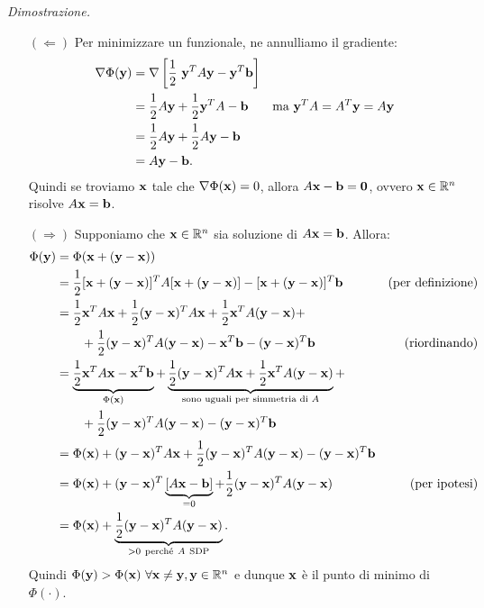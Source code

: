 \textit{Dimostrazione.}
\begin{itemize}
  \item [$(\Leftarrow)$] Per minimizzare un funzionale, ne annulliamo il gradiente:
  \begin{align*}
    \nabla \Phi (\mathbf{y}) & =\nabla \left[\frac{1}{2} \ \mathbf{y}^{T} A\mathbf{y} -\mathbf{y}^{T}\mathbf{b}\right] & \\
    & =\frac{1}{2} A\mathbf{y} +\frac{1}{2}\mathbf{y}^{T} A-\mathbf{b} & \text{ma $\mathbf{y}^{T} A=A^{T}\mathbf{y} =A\mathbf{y}$} \\
    & =\frac{1}{2} A\mathbf{y} +\frac{1}{2} A\mathbf{y} -\mathbf{b} & \\
    & =A\mathbf{y} -\mathbf{b}. &
  \end{align*}
  Quindi se troviamo $\mathbf{x}$ tale che $\nabla \Phi (\mathbf{x}) =0$, allora $A\mathbf{x} -\mathbf{b} =\mathbf{0}$, ovvero $\mathbf{x} \in \mathbb{R}^{n}$ risolve $A\mathbf{x} =\mathbf{b}$.

  \item[$(\Rightarrow)$] Supponiamo che $\mathbf{x} \in \mathbb{R}^{n}$ sia soluzione di $A\mathbf{x} =\mathbf{b}$. Allora:
  \begin{align*}
    \Phi (\mathbf{y}) & =\Phi (\mathbf{x} +(\mathbf{y} -\mathbf{x})) & \\
    & =\frac{1}{2}[\mathbf{x} +(\mathbf{y} -\mathbf{x})]^{T} A[\mathbf{x} +(\mathbf{y} -\mathbf{x})] -[\mathbf{x} +(\mathbf{y} -\mathbf{x})]^{T}\mathbf{b} & \text{(per definizione)} \\
    & =\frac{1}{2}\mathbf{x}^{T} A\mathbf{x} +\frac{1}{2}(\mathbf{y} -\mathbf{x})^{T} A\mathbf{x} +\frac{1}{2}\mathbf{x}^{T} A(\mathbf{y} -\mathbf{x}) + & \\
    & \qquad +\frac{1}{2}(\mathbf{y} -\mathbf{x})^{T} A(\mathbf{y} -\mathbf{x}) -\mathbf{x}^{T}\mathbf{b} -(\mathbf{y} -\mathbf{x})^{T}\mathbf{b} & \text{(riordinando)} \\
    & =\underbrace{\frac{1}{2}\mathbf{x}^{T} A\mathbf{x} -\mathbf{x}^{T}\mathbf{b}}_{\Phi (\mathbf{x})} +\underbrace{\frac{1}{2}(\mathbf{y} -\mathbf{x})^{T} A\mathbf{x} +\frac{1}{2}\mathbf{x}^{T} A(\mathbf{y} -\mathbf{x})}_{\text{sono uguali per simmetria di } A} + & \\
    & \qquad +\frac{1}{2}(\mathbf{y} -\mathbf{x})^{T} A(\mathbf{y} -\mathbf{x}) -(\mathbf{y} -\mathbf{x})^{T}\mathbf{b} & \\
    & =\Phi (\mathbf{x}) +(\mathbf{y} -\mathbf{x})^{T} A\mathbf{x} +\frac{1}{2}(\mathbf{y} -\mathbf{x})^{T} A(\mathbf{y} -\mathbf{x}) -(\mathbf{y} -\mathbf{x})^{T}\mathbf{b} & \\
    & =\Phi (\mathbf{x}) +(\mathbf{y} -\mathbf{x})^{T}\underbrace{[ A\mathbf{x} -\mathbf{b}]}_{=0} +\frac{1}{2}(\mathbf{y} -\mathbf{x})^{T} A(\mathbf{y} -\mathbf{x}) & \text{(per ipotesi)} \\
    & =\Phi (\mathbf{x}) +\underbrace{\frac{1}{2}(\mathbf{y} -\mathbf{x})^{T} A(\mathbf{y} -\mathbf{x})}_{ >0\ \text{perché} \ A\ \text{SDP}}. &
  \end{align*}
  Quindi $\Phi (\mathbf{y})  >\Phi (\mathbf{x}) \ \forall \mathbf{x} \neq \mathbf{y} ,\mathbf{y} \in \mathbb{R}^{n}$ e dunque $\mathbf{x}$ è il punto di minimo di $\Phi ( \cdot )$. \textqed
\end{itemize}

